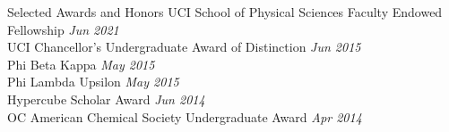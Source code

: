 \documentclass{resume} %
\begin{document}
%
%    

\begin{rSection}{Selected Awards and Honors}
  UCI School of Physical Sciences Faculty Endowed Fellowship \hfill {\em Jun 2021} \\
  UCI Chancellor's Undergraduate Award of Distinction \hfill {\em Jun 2015} \\
  Phi Beta Kappa \hfill {\em May 2015} \\
  Phi Lambda Upsilon \hfill {\em May 2015} \\
  Hypercube Scholar Award \hfill {\em Jun 2014} \\
  OC American Chemical Society Undergraduate Award \hfill {\em Apr 2014}
\end{rSection}

\end{document}
